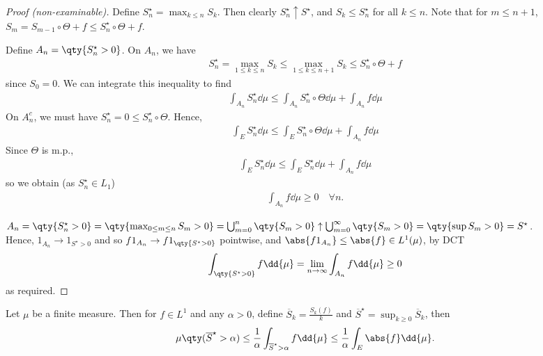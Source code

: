 \begin{proof}[Proof (non-examinable)]
    Define $S_n^\star = \max_{k \leq n} S_k$.
    Then clearly $S_n^\star \uparrow S^\star$, and $S_k \leq S_n^\star$ for all $k \leq n$.
    Note that for $m \leq n+1$, $S_m = S_{m-1} \circ \Theta + f \leq S_n^\star \circ \Theta + f$.

    Define $A_n = \qty{S_n^\star > 0}$.
    On $A_n$, we have
    \begin{align*}
        S_n^\star = \max_{1 \leq k \leq n} S_k \leq \max_{1 \leq k \leq n+1} S_k \leq S_n^\star \circ \Theta + f
    \end{align*}
    since $S_0 = 0$.
    We can integrate this inequality to find
    \begin{align*}
        \int_{A_n} S_n^\star \dd{\mu} \leq \int_{A_n} S_n^\star \circ \Theta \dd{\mu} + \int_{A_n} f \dd{\mu}
    \end{align*}
    On $A_n^c$, we must have $S_n^\star = 0 \leq S_n^\star \circ \Theta$.
    Hence,
    \begin{align*}
        \int_E S_n^\star \dd{\mu} \leq \int_E S_n^\star \circ \Theta \dd{\mu} + \int_{A_n} f \dd{\mu}
    \end{align*}
    Since $\Theta$ is m.p.,
    \begin{align*}
        \int_E S_n^\star \dd{\mu} \leq \int_E S_n^\star \dd{\mu} + \int_{A_n} f \dd{\mu}
    \end{align*}
    so we obtain (as $S_n^\star \in L_1$)
    \begin{align*}
        \int_{A_n} f \dd{\mu} \geq 0 \quad \forall n.
    \end{align*}

	$A_n = \qty{S_n^\star > 0} = \qty{\max_{0 \leq m \leq n} S_m > 0} = \bigcup_{m = 0}^n \qty{S_m > 0} \uparrow \bigcup_{m = 0}^\infty \qty{S_m > 0} = \qty{\sup S_m > 0} = S^\star$. \\
	Hence, $1_{A_n} \to 1_{S^\star > 0}$ and so $f 1_{A_n} \to f 1_{\qty{S^\star > 0}}$ pointwise, and $\abs{f 1_{A_n}} \leq \abs{f} \in L^1(\mu)$, by DCT
    \begin{align*}
        \int_{\qty{S^\star > 0}} f \dd{\mu} = \lim_{n \to \infty} \int_{A_n} f \dd{\mu} \geq 0
    \end{align*}
    as required.
\end{proof}

\begin{remark}
	Let $\mu$ be a finite measure.
	Then for $f \in L^1$ and any $\alpha > 0$, define $\overline S_k = \frac{S_k(f)}{k}$ and $\overline S^\star = \sup_{k \geq 0} \overline S_k$, then
	\begin{align*}
		\mu\qty(\overline S^\star > \alpha) \leq \frac{1}{\alpha} \int_{\overline S^\star > \alpha} f \dd{\mu} \leq \frac{1}{\alpha} \int_E \abs{f} \dd{\mu}.
	\end{align*}
\end{remark}


